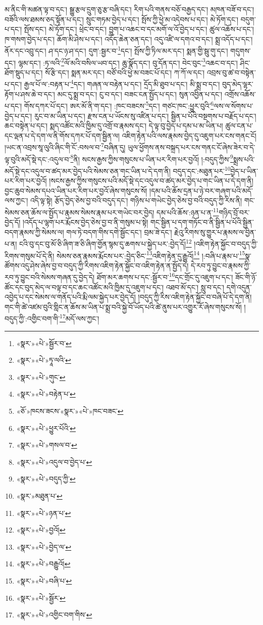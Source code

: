 མ་ནིང་གི་མཚན་ལྟ་བ་དང་། སྒྱུ་རྩལ་དྲུག་ཅུ་རྩ་བཞི་དང་། རིག་པའི་གནས་བཅོ་བརྒྱད་དང་། མཁན་བཟོ་བ་དང་། བཟོའི་ལས་ཐམས་ཅད་སྟོན་པ་དང་། སྲུང་གཏམ་བྱེད་པ་དང་། སྤོས་ཀྱི་ཕྱེ་མ་འདེབས་པ་དང་། མེ་ཏོག་དང་། བདུག་པ་དང་། སྤོས་དང་། མེ་ཏོག་དང་། ཕྲེང་བ་དང་། བྱུག་པ་འཆང་བ་དང་མགོ་ལ་འོ་བྱེད་པ་དང་། ཚུལ་འཆོས་པ་དང་། ཁ་གསག་བྱེད་པ་དང་། ཆོག་མི་ཤེས་པ་དང་། འདོད་ཆེན་ཅན་དང་། འདུ་འཛི་ལ་དགའ་བ་དང་། སྨྲ་འདོད་པ་དང་། ནོར་དང་འབྲུ་དང་། ཤ་དང་ཉ་ཤ་དང་། དུག་:སྦྱར་བ་\footnote{«སྣར་»«པེ་»སྦྱོར་བ་}དང་། སྤོས་ཀྱི་ཏིལ་མར་དང་། སྨན་གྱི་སྦུ་གུ་དང་། གདུགས་དང་། ལྷམ་དང་། :ཏ་ལའི་\footnote{«སྣར་»«པེ་»ཏཱ་ལའི་}ལོ་མའི་བསིལ་ཡབ་དང་། ཆུ་སྣོད་དང་། བུ་དོན་དང་། བེང་བུང་\footnote{«སྣར་»«པེ་»གུང་}འཆང་བ་དང་། ཤིང་ཐོག་སྡུད་པ་དང་། སོ་རྩི་དང་། སྨན་མར་དང་། བཙོ་བའི་ཕྱེ་མ་བཟང་པོ་དང་། ཀ་ཀོ་ལ་དང་། འབྲས་བུ་ཚ་བ་བསྟེན་པ་དང་། རྒྱལ་པོ་ལ་:བརྟན་པ་\footnote{«སྣར་»«པེ་»བརྟེན་པ་}དང་། གཞན་ལ་བརྟེན་པ་དང་། དྲོད་མི་ཐུབ་པ་དང་། མི་སྨྲ་བ་དང་། བུད་མེད་ལྷར་རྟོག་པ་ཤས་ཆེ་བ་དང་། མང་དུ་སྨྲ་བ་དང་། ངུ་བ་དང་། བཟང་ངན་སྤྱོད་པ་དང་། སུན་འབྱིན་པ་དང་། འགྲོས་འཆོས་པ་དང་། གོས་དཀར་པོ་དང་། ཨར་མོ་ནི་ག་དང་། :ཁང་བཟངས་\footnote{«ཅོ་»ཁངས་ཟངས་«སྣར་»«པེ་»ཁང་བཟང་}དང་། གཙང་ཁང་:ཕྱུར་བུའི་\footnote{«སྣར་»«པེ་»ཕྱུར་པོའི་}ལས་ལ་སོགས་པ་བྱེད་པ་དང་། རུང་བ་མ་ཡིན་པ་དང་། རྫས་ངན་པ་ཡོངས་སུ་འཛིན་པ་དང་། སྦྱིན་པ་པོའི་བསྔགས་པ་བརྗོད་པ་དང་། ཆང་བསྟེན་པ་དང་། སྨད་འཚོང་མའི་ཁྱིམ་དུ་འགྲོ་བ་རྣམས་དང་། དེ་ལྟ་བུ་བྱེད་པ་དམ་པ་མ་ཡིན་པ། ཚུལ་ངན་པ་དང་ལྡན་པ་དེ་དག་ལ་ནི་གོས་དཀར་པོ་དག་སྦྱིན་ལ། འཇིག་རྟེན་པའི་ལས་རྣམས་བྱེད་དུ་འཇུག་པར་ངས་གནང་ངོ། །ཡང་ན་འབྲས་སཱ་ལུའི་ཞིང་གི་ངོ་:བསལ་བ་\footnote{«སྣར་»«པེ་»གསལ་བ་}བཞིན་དུ། ཡུལ་ཕྱོགས་ནས་བསྐྲད་པར་ངས་གནང་ངོ་ཞེས་ཟེར་བ་དེ་ལྟ་བུའི་མདོ་སྡེ་དང་:འདུལ་བ་\footnote{«སྣར་»«པེ་»འདུལ་བ་བྱེད་པ་}ནི། སངས་རྒྱས་ཀྱིས་གསུངས་པ་ཡིན་པར་རིག་པར་བྱའོ། །:བདུད་ཀྱིས་\footnote{«སྣར་»«པེ་»བདུད་ཀྱི་}སྨྲས་པའི་མདོ་སྡེ་དང་འདུལ་བ་ཚད་མར་བྱེད་པའི་སེམས་ཅན་གང་ཡིན་པ་དེ་དག་ནི། བདུད་དང་:མཐུན་པར་\footnote{«སྣར་»མཐུན་པ་}བྱེད་པ་ཡིན་པར་རིག་པར་བྱའོ། །སངས་རྒྱས་ཀྱིས་གསུངས་པའི་མདོ་སྡེ་དང་འདུལ་བ་ཚད་མར་བྱེད་པ་གང་ཡིན་པ་དེ་དག་ནི། བྱང་ཆུབ་སེམས་དཔའ་ཡིན་པར་རིག་པར་བྱའོ་ཞེས་གསུངས་སོ། །དམ་པའི་ཆོས་དྲན་པ་ཉེ་བར་གཞག་པའི་མདོ་ལས་ཀྱང་། འདི་ལྟ་སྟེ། རྩོད་བྱེད་ཅེས་བྱ་བའི་བདུད་དང་། གཉིས་པ་གཡེང་བྱེད་ཅེས་བྱ་བའི་བདུད་ཀྱི་རིས་ནི། གང་སེམས་ཅན་ཆོས་ལ་སྤྱོད་པ་རྣམས་སེམས་རྣམ་པར་གཡེང་བར་བྱེད། དམ་པའི་ཆོས་:ཉན་པ་ན་\footnote{«སྣར་»«པེ་»ཉན་པ་}གཉིད་བྲོ་བར་བྱེད་དོ། །འདོད་པ་ལྷག་པར་རྨོངས་བྱེད་ཅེས་བྱ་བ་ནི་གསུམ་པ་སྟེ། གང་སྦྱིན་པ་དག་གཏོང་བ་ནི་སྦྱིན་པ་པོའི་སྦྱིན་བདག་རྣམས་ཀྱི་སེམས་ལ། གལ་ཏེ་བདག་གིས་དགེ་སྦྱོང་དང་། བྲམ་ཟེ་དང་། རྗེའུ་རིགས་སུ་གྱུར་པ་རྣམས་ལ་བྱིན་པ་ན། ངའི་བུ་དང་བུ་མོ་ཅི་ཞིག་ཟ་ཅི་ཞིག་གྱོན་སྙམ་དུ་ཆགས་པ་སྐྱེད་པར་:བྱེད་དོ།\footnote{«སྣར་»«པེ་»བྱའོ།} །འཇིག་རྟེན་སྐྱོང་བ་བདུད་ཀྱི་རིགས་གསུམ་པོ་དེ་ནི། སེམས་ཅན་རྣམས་རྨོངས་པར་:བྱེད་ཅིང་\footnote{«སྣར་»«པེ་»བྱེད་ལ་}འཇིག་རྟེན་དུ་རྒྱུའོ།\footnote{«སྣར་»«པེ་»བརྒྱུའོ།} །:བཞི་པ་རྣམ་པ་\footnote{«སྣར་»«པེ་»བཞི་པ་}སྣ་ཚོགས་འདུ་ཤེས་ཞེས་བྱ་བ་བདུད་ཀྱི་རིགས་འཇིག་རྟེན་སྐྱོང་བ་འཇིག་རྟེན་ན་སྤྱོད་དེ། དེ་རབ་ཏུ་བྱུང་བ་རྣམས་ཀྱི་རབ་ཏུ་བྱུང་བའི་སེམས་གཞན་དུ་བྱེད་དེ། ཐོག་མར་ཆགས་པ་དང་:སྦྱོར་བ་\footnote{«སྣར་»«པེ་»སྦྱོར་}དང་གྲོང་དུ་འཇུག་པ་དང་། ཟོང་གི་ཉོ་ཚོང་དང་བུད་མེད་ལ་བལྟ་བ་དང་ཆང་འཚོང་མའི་ཁྱིམ་དུ་འཇུག་པ་དང་། འཐབ་མོ་དང་། སླུ་བ་དང་། དགེ་འདུན་འབྱེད་པ་དང་སེམས་ལ་གནོད་པའི་རྨི་ལམ་སྐྱེད་པར་བྱེད་དོ། །བདུད་ཀྱི་རིས་འཇིག་རྟེན་སྐྱོང་བ་བཞི་པོ་དེ་དག་ནི། གང་གི་ཚེ་འཛམ་བུའི་གླིང་ན་ཆོས་མ་ཡིན་པ་སྨྲ་བའི་སྐྱེ་བོ་ཡོད་པའི་ཚེ་ནུས་པར་འགྱུར་རོ་ཞེས་གསུངས་སོ། །བདུད་ཀྱི་:འགྱིང་བག་གི་\footnote{«སྣར་»«པེ་»འགྱིང་བག་གིས་}མདོ་ལས་ཀྱང་། 
